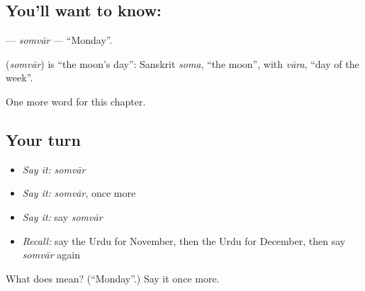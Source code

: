 \subsection*{You'll want to know: }
\textbf{} — \emph{somvār} — \textquotedblleft{}Monday\textquotedblright{}.

\begin{cousinweb}
\textbf{} (\emph{somvār}) is \textquotedblleft{}the moon's day\textquotedblright{}: Sanskrit \emph{soma}, \textquotedblleft{}the moon\textquotedblright{}, with \emph{vāra}, \textquotedblleft{}day of the week\textquotedblright{}.
\end{cousinweb}

\begin{grammarlens}[title={What you've built}]
One more word for this chapter.
\end{grammarlens}

\subsection*{Your turn}
\begin{itemize}
\raggedright
  \item \emph{Say it:} \emph{somvār}
  \item \emph{Say it:} \emph{somvār}, once more
  \item \emph{Say it:} say \emph{somvār}
  \item \emph{Recall:} say the Urdu for November, then the Urdu for December, then say \emph{somvār} again
\end{itemize}

\begin{tcolorbox}[breakable,colback=teal!4,colframe=teal!35!black,title={Before you move on}]
What does  mean? (\textquotedblleft{}Monday\textquotedblright{}.) Say it once more.
\end{tcolorbox}
